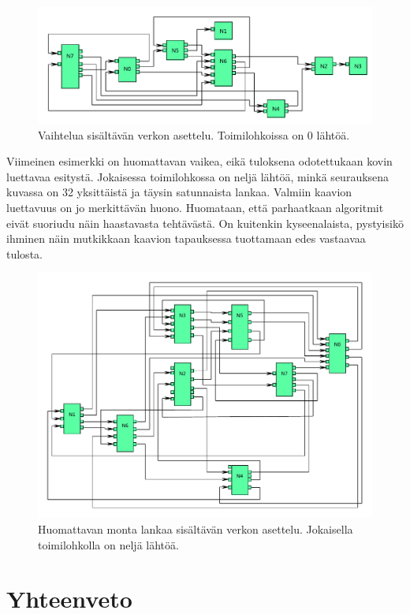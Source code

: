 \documentclass[finnish,12pt]{article}
\begin{document}
\begin{figure}[ht]
	\includegraphics[width=\textwidth]{esim2.pdf}
	\caption{Vaihtelua sisältävän verkon asettelu. Toimilohkoissa on 0 lähtöä.}
\end{figure}

Viimeinen esimerkki on huomattavan vaikea, eikä tuloksena odotettukaan kovin luettavaa esitystä.
Jokaisessa toimilohkossa on neljä lähtöä, minkä seurauksena kuvassa on 32 yksittäistä ja täysin satunnaista lankaa.
Valmiin kaavion luettavuus on jo merkittävän huono. Huomataan, että parhaatkaan algoritmit eivät suoriudu näin haastavasta tehtävästä.
On kuitenkin kyseenalaista, pystyisikö ihminen näin mutkikkaan kaavion tapauksessa tuottamaan edes vastaavaa tulosta.

\begin{figure}[ht]
	\includegraphics[width=\textwidth]{esim3.pdf}
	\caption{Huomattavan monta lankaa sisältävän verkon asettelu. Jokaisella toimilohkolla on neljä lähtöä.}
\end{figure}



	\clearpage
	\section{Yhteenveto}
\end{document}
